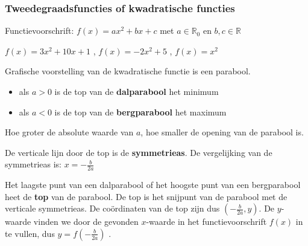 \subsubsection{Tweedegraadsfuncties of kwadratische functies}



\begin{definitie}
	Functievoorschrift: $f(x)=ax^{2}+bx+c$ met $a\in\mathbb{R}_{0}$
en $b,c\in\mathbb{R}$ 

\end{definitie}

\begin{voorbeeld}
	$f(x)=3x^{2}+10x+1$ , $f(x)=-2x^{2}+5$
, $f(x)=x^{2}$
\end{voorbeeld}

Grafische voorstelling van de kwadratische functie
is een parabool.



\begin{itemize}
\item als $a>0$ is de top van de \textbf{dalparabool} het minimum
\item als $a<0$ is de top van de \textbf{bergparabool} het maximum
\end{itemize}
Hoe groter de absolute waarde van $a$, hoe smaller de opening
van de parabool is.

De verticale lijn door de top is de \textbf{symmetrieas}.
De vergelijking van de symmetrieas is: $x=-\frac{b}{2a}$ 

Het laagste punt van een dalparabool of het hoogste punt
van een bergparabool heet de \textbf{top} van de parabool. De top
is het snijpunt van de parabool met de verticale symmetrieas. De co\"ordinaten
van de top zijn dus $(-\frac{b}{2a},y)$. De $y$-waarde vinden we
door de gevonden $x$-waarde in het functievoorschrift $f(x)$ in
te vullen, dus $y=f(-\frac{b}{2a})$ .

